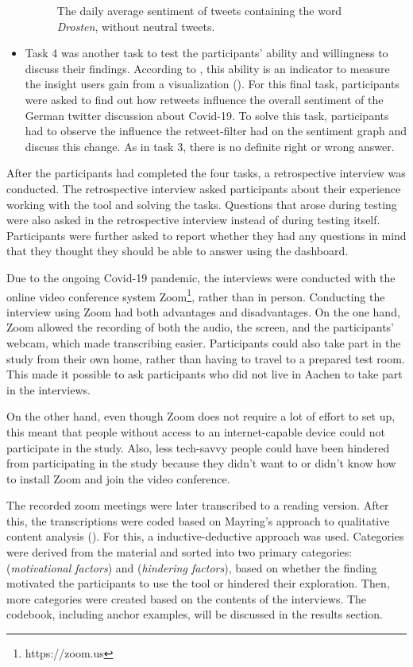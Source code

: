 \begin{itemize}
\begin{figure}[htb]
        \caption{The daily average sentiment of tweets containing the word \emph{Drosten}, without neutral tweets.}
        \label{fig:sentiment_drosten_noneutral}
    \end{figure}
    \item Task 4 was another task to test the participants' ability and willingness to discuss their findings. According to \citeauthor{northMeasuringVisualizationInsight2006}, this ability is an indicator to measure the insight users gain from a visualization (\cite{northMeasuringVisualizationInsight2006}). For this final task, participants were asked to find out how retweets influence the overall sentiment of the German twitter discussion about Covid-19. To solve this task, participants had to observe the influence the retweet-filter had on the sentiment graph and discuss this change. As in task 3, there is no definite right or wrong answer.
\end{itemize}

After the participants had completed the four tasks, a retrospective interview was conducted. The retrospective interview asked participants about their experience working with the tool and solving the tasks. Questions that arose during testing were also asked in the retrospective interview instead of during testing itself. Participants were further asked to report whether they had any questions in mind that they thought they should be able to answer using the dashboard.

Due to the ongoing Covid-19 pandemic, the interviews were conducted with the online video conference system Zoom\footnote{https://zoom.us}, rather than in person. Conducting the interview using Zoom had both advantages and disadvantages. On the one hand, Zoom allowed the recording of both the audio, the screen, and the participants' webcam, which made transcribing easier. Participants could also take part in the study from their own home, rather than having to travel to a prepared test room. This made it possible to ask participants who did not live in Aachen to take part in the interviews.

On the other hand, even though Zoom does not require a lot of effort to set up, this meant that people without access to an internet-capable device could not participate in the study. Also, less tech-savvy people could have been hindered from participating in the study because they didn't want to or didn't know how to install Zoom and join the video conference.

The recorded zoom meetings were later transcribed to a reading version. After this, the transcriptions were coded based on Mayring's approach to qualitative content analysis (\cite{mayring2010qualitative}). For this, a inductive-deductive approach was used. Categories were derived from the material and sorted into two primary categories:  (\emph{motivational factors}) and  (\emph{hindering factors}), based on whether the finding motivated the participants to use the tool or hindered their exploration. Then, more categories were created based on the contents of the interviews. The codebook, including anchor examples, will be discussed in the results section. 

